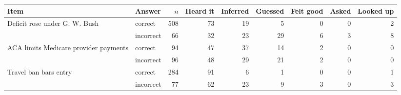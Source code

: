 \begin{tabular}{llrrrrrrr}
\toprule
Item & Answer & $n$ & Heard it & Inferred & Guessed & Felt good & Asked & Looked up \\
\midrule
Deficit rose under G. W. Bush & correct & 508 & 73 & 19 & 5 & 0 & 0 & 2 \\
 & incorrect & 66 & 32 & 23 & 29 & 6 & 3 & 8 \\
ACA limits Medicare provider payments & correct & 94 & 47 & 37 & 14 & 2 & 0 & 0 \\
 & incorrect & 96 & 48 & 29 & 21 & 2 & 0 & 0 \\
Travel ban bars entry & correct & 284 & 91 & 6 & 1 & 0 & 0 & 1 \\
 & incorrect & 77 & 62 & 23 & 9 & 3 & 0 & 3 \\
\bottomrule
\end{tabular}
